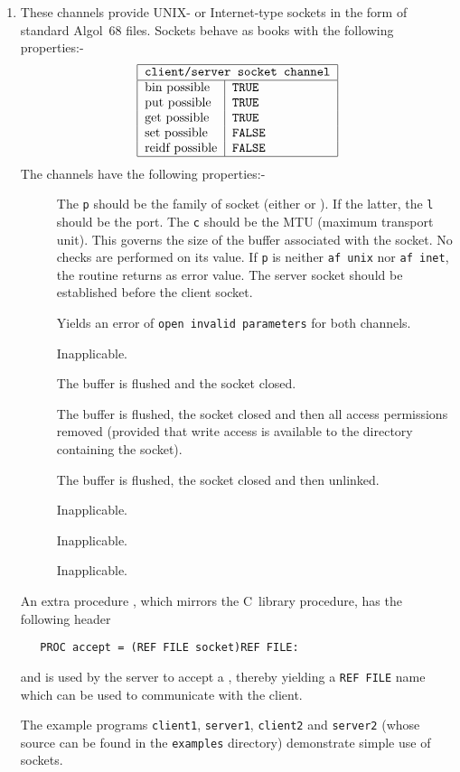 \begin{enumerate}
\item {}\newline
{}\newline
These channels provide UNIX- or Internet-type sockets in the form
of standard Algol~68 files.
Sockets behave as books with the following properties:-
$$\begin{tabular}{|l|l|}\hline
  \multicolumn{2}{|c|}{\texttt{client/server socket channel}}\\ \hline
  bin possible & \texttt{TRUE}\\
  put possible & \texttt{TRUE}\\
  get possible & \texttt{TRUE}\\
  set possible & \texttt{FALSE}\\
  reidf possible & \texttt{FALSE}\\ \hline
  \end{tabular}
$$
The channels have the following properties:-
\begin{description}
\item[] The \verb|p| should be the family of socket (either
 or ). If the latter, the \verb|l| should
be the port. The \verb|c| should be the MTU (maximum transport unit).
This governs the size of the buffer associated with the socket. No
checks are performed on its value. If \verb|p| is neither \verb|af unix|
nor \verb|af inet|, the routine returns  as error value. The server socket should be established
before the client socket.
\item[] Yields an error of \verb|open invalid parameters| for
both channels.
\item[] Inapplicable.
\item[] The buffer is flushed and the socket closed.
\item[]  The buffer is flushed, the socket closed and then all
access permissions removed (provided that write access is available to
the directory containing the socket).
\item[] The buffer is flushed, the socket closed and then
unlinked.
\item[] Inapplicable.
\item[] Inapplicable.
\item[] Inapplicable.
\end{description}
An extra procedure , which mirrors the C~library procedure,
has the following header
\begin{verbatim}
   PROC accept = (REF FILE socket)REF FILE:
\end{verbatim}
\noindent
and is used by the server to accept a , thereby
yielding a \verb|REF FILE| name which can be used to communicate with
the client.

The example programs \verb|client1|, \verb|server1|, \verb|client2|
and \verb|server2| (whose source can be found in the \verb|examples|
directory) demonstrate simple use of sockets.
\end{enumerate}

